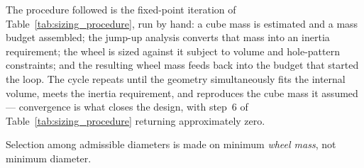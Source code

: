 The procedure followed is the fixed-point iteration of
Table~\ref{tab:sizing_procedure}, run by hand: a cube mass is estimated and a
mass budget assembled; the jump-up analysis converts that mass into an
inertia requirement; the wheel is sized against it subject to volume and
hole-pattern constraints; and the resulting wheel mass feeds back into the
budget that started the loop. The cycle repeats until the geometry
simultaneously fits the internal volume, meets the inertia requirement, and
reproduces the cube mass it assumed --- convergence is what closes the design,
with step~6 of Table~\ref{tab:sizing_procedure} returning approximately zero.

Selection among admissible diameters is made on minimum \emph{wheel mass}, not
minimum diameter.